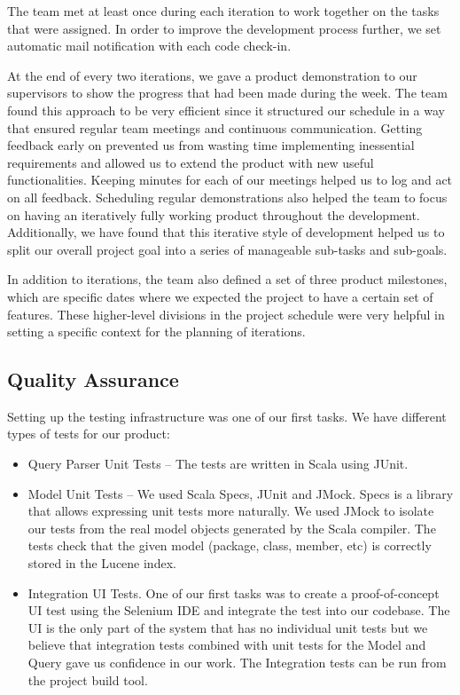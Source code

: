The team met at least once during each iteration to work together on the tasks that were assigned. In order to improve the development process further, we set automatic mail notification with each code check-in.

At the end of every two iterations, we gave a product demonstration to our supervisors to show the progress that had been made during the week. The team found this approach to be very efficient since it structured our schedule in a way that ensured regular team meetings and continuous communication. Getting feedback early on prevented us from wasting time implementing inessential requirements and allowed us to extend the product with new useful functionalities. Keeping minutes for each of our meetings helped us to log and act on all feedback. Scheduling regular demonstrations also helped the team to focus on having an iteratively fully working product throughout the development. Additionally, we have found that this iterative style of development helped us to split our overall project goal into a series of manageable sub-tasks and sub-goals.

In addition to iterations, the team also defined a set of three product milestones, which are specific dates where we expected the project to have a certain set of features. These higher-level divisions in the project schedule were very helpful in setting a specific context for the planning of iterations. 

\subsection{Quality Assurance}

Setting up the testing infrastructure was one of our first tasks. We have different types of tests for our product:
\begin{itemize}
\item Query Parser Unit Tests – The tests are written in Scala using JUnit.
\item Model Unit Tests – We used Scala Specs, JUnit and JMock. Specs is a library that allows expressing unit tests more naturally. We used JMock to isolate our tests from the real model objects generated by the Scala compiler. The tests check that the given model (package, class, member, etc) is correctly stored in the Lucene index.
\item Integration UI Tests. One of our first tasks was to create a proof-of-concept UI test using the Selenium IDE and integrate the test into our codebase. The UI is the only part of the system that has no individual unit tests but we believe that integration tests combined with unit tests for the Model and Query gave us confidence in our work. The Integration tests can be run from the project build tool.
\end{itemize}

